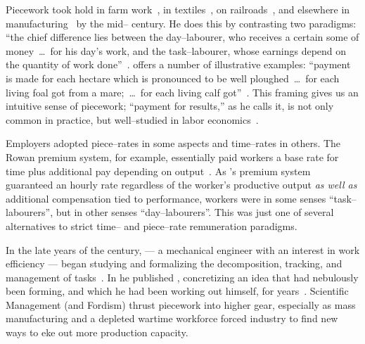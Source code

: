 \documentclass[trackingWork]{subfiles}
\begin{document}
Piecework took hold in farm work~\cite{hughRaynbirdTaskWork}, %
in textiles~\cite{restructuringPieceworkBaker,riisOtherSideLives},
on railroads~\cite{Brown01041990}, and 
elsewhere in manufacturing~\cite{10.2307/3827491} by the mid-- century.
He does this by contrasting two paradigms:
``the chief difference lies between the day--labourer,
who receives a certain some of money~\dots~for his day's work,
and the task--labourer, whose earnings depend on the quantity of work done''~\cite{hughRaynbirdTaskWork}.
\citeauthor{10.2307/2338394} offers a number of illustrative examples:
``payment is made for each hectare which is pronounced to be well ploughed~\dots~for each living foal got from a mare;~\dots~for each living calf got''~\cite{10.2307/2338394}.
This framing gives us an intuitive sense of piecework;
``payment for results,'' as he calls it,
is not only common in practice, but
well--studied in labor economics~\cite{Figlio2007901,weitzman1976new,10.2307/3003414,BJIR:BJIR038}.

Employers adopted piece--rates in some aspects and
time--rates in others.
The Rowan premium system, for example,
essentially paid workers
a base rate for time plus
additional pay depending on output~\cite{rowan1901premium}.
As \citeauthor{rowan1901premium}'s premium system guaranteed an hourly rate
regardless of the worker's productive output
\textit{as well as} additional compensation tied to performance,
workers were
in some senses ``task--labourers'', but
in other senses ``day--labourers''.
This was just one of several alternatives to strict time-- and piece--rate remuneration paradigms.

In the late years of the  century, \citeauthor{taylor1914principles}
--- a mechanical engineer with an interest in work efficiency ---
began studying and formalizing the decomposition, tracking, and management of tasks~\cite{taylor1896piece}.
In \citeyear{taylor1914principles} he published ,
concretizing an idea that had nebulously been forming,
and which he had been working out himself, for years~\cite{taylor1914principles}.
Scientific Management (and Fordism) thrust piecework into higher gear, especially as
mass manufacturing and
a depleted wartime workforce forced industry to find new ways to eke out more production capacity.
\end{document}
